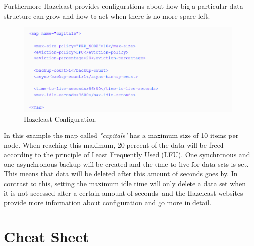Furthermore Hazelcast provides configurations about how big a particular data structure can grow and how to act when there is no more space left. 
\begin{flushleft}
\begin{figure}[h]
    \includegraphics{img/hazelcastXML.PNG}
    \caption{Hazelcast Configuration \parencite{johns2015}}
\end{figure}
\end{flushleft}
In this example the map called \textit{"capitals"} has a maximum size of 10 items per node. When reaching this maximum, 20 percent of the data will be freed according to the principle of Least Frequently Used (LFU). One synchronous and one asynchronous backup will be created and the time to live for data sets is set. This means that data will be deleted after this amount of seconds goes by. In contrast to this, setting the maximum idle time will only delete a data set when it is not accessed after a certain amount of seconds.
\citeauthor{johns2015} and the Hazelcast websites provide more information about configuration and go more in detail.

\section{Cheat Sheet}
